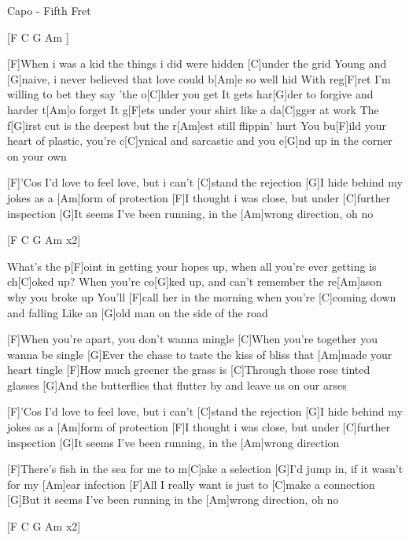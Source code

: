 
Capo - Fifth Fret

[F C G Am ]

                                           
[F]When i was a kid the things i did were hidden [C]under the grid
Young and [G]naive, i never believed that love could b[Am]e so well hid
With reg[F]ret I'm willing to bet they say 'the o[C]lder you get           
It gets har[G]der to forgive and harder t[Am]o forget                         
It g[F]ets under your shirt like a da[C]gger at work                               
The f[G]irst cut is the deepest but the r[Am]est still flippin' hurt                           
You bu[F]ild your heart of plastic, you're c[C]ynical and sarcastic
and you e[G]nd up in the corner on your own

                                     
[F]'Cos I'd love to feel love, but i can't [C]stand the rejection
[G]I hide behind my jokes as a [Am]form of protection
[F]I thought i was close, but under [C]further inspection
[G]It seems I've been running, in the [Am]wrong direction, oh no

[F C G Am x2]
                                            
What's the p[F]oint in getting your hopes up, when all you're ever getting is ch[C]oked up?
When you're co[G]ked up, and can't remember the re[Am]ason why you broke up
You'll [F]call her in the morning when you're [C]coming down and falling
Like an [G]old man on the side of the road

[F]When you're apart, you don't wanna mingle
[C]When you're together you wanna be single                             
[G]Ever the chase to taste the kiss of bliss that [Am]made your heart tingle
[F]How much greener the grass is
[C]Through those rose tinted glasses
[G]And the butterflies that flutter by and leave us on our arses

[F]'Cos I'd love to feel love, but i can't [C]stand the rejection
[G]I hide behind my jokes as a [Am]form of protection
[F]I thought i was close, but under [C]further inspection
[G]It seems I've been running, in the [Am]wrong direction
                       
[F]There's fish in the sea for me to m[C]ake a selection
[G]I'd jump in, if it wasn't for my [Am]ear infection
[F]All I really want is just to [C]make a connection
[G]But it seems I've been running in the [Am]wrong direction, oh no

[F C G Am x2]

